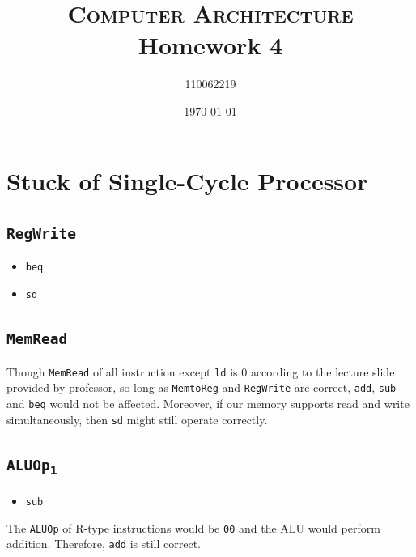 \documentclass[12pt, a4paper]{article}
\title{\textsc{Computer Architecture} Homework 4}
\author{110062219}
\date{\today}
\begin{document}
\maketitle

\tableofcontents

\section{Stuck of Single-Cycle Processor}

\subsection{\texttt{RegWrite}}

\begin{itemize}
\item \texttt{beq}
\item \texttt{sd}
\end{itemize}

\subsection{\texttt{MemRead}}


Though \texttt{MemRead} of all instruction except \texttt{ld} is 0 according to the lecture slide provided by professor, so long as \texttt{MemtoReg} and \texttt{RegWrite} are correct, \texttt{add}, \texttt{sub} and \texttt{beq} would not be affected. Moreover, if our memory supports read and write simultaneously, then \texttt{sd} might still operate correctly.

\subsection{\texttt{ALUOp\textsubscript{1}}}

\begin{itemize}
\item \texttt{sub}
\end{itemize}

The \texttt{ALUOp} of R-type instructions would be \texttt{00} and the ALU would perform addition. Therefore, \texttt{add} is still correct.
\end{document}
